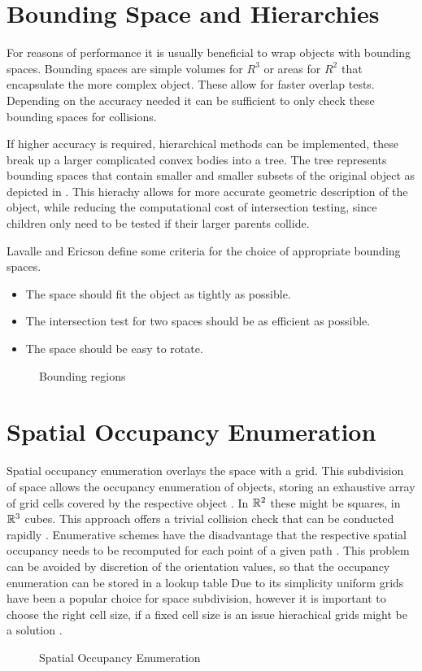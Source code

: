 \section{Bounding Space and Hierarchies}
For reasons of performance it is usually beneficial to wrap objects with bounding spaces. Bounding spaces are simple volumes for $R^3$ or areas for $R^2$ that encapsulate the more complex object. These allow for faster overlap tests. Depending on the accuracy needed it can be sufficient to only check these bounding spaces for collisions. \cite{LaValle.2006,Ericson.2005}

If higher accuracy is required, hierarchical methods can be implemented, these break up a larger complicated convex bodies into a tree. The tree represents bounding spaces that contain smaller and smaller subsets of the original object as depicted in . This hierachy allows for more accurate geometric description of the object, while reducing the computational cost of intersection testing, since children only need to be tested if their larger parents collide. \cite{LaValle.2006,Ericson.2005}

Lavalle and Ericson define some criteria for the choice of appropriate bounding spaces.

\begin{itemize}
	\item The space should fit the object as tightly as possible.
	\item The intersection test for two spaces should be as efficient as possible.
	\item The space should be easy to rotate.
\end{itemize}

\begin{figure}[h]
    \caption{Bounding regions}
    \label{fig:boundingRegions}
\end{figure}

\section{Spatial Occupancy Enumeration}
Spatial occupancy enumeration overlays the space with a grid. This subdivision of space allows the occupancy enumeration of objects, storing an exhaustive array of grid cells covered by the respective object \cite{Ericson.2005,Hayward.1986}. In $\mathbb{R}^2$ these might be squares, in $\mathbb{R}^3$ cubes. This approach offers a trivial collision check that can be conducted rapidly \cite{Ericson.2005,Hayward.1986}. Enumerative schemes have the disadvantage that the respective spatial occupancy needs to be recomputed for each point of a given path \cite{Hayward.1986}. This problem can be avoided by discretion of the orientation values, so that the occupancy enumeration can be stored in a lookup table \cite{Ziegler.2008} Due to its simplicity uniform grids have been a popular choice for space subdivision, however it is important to choose the right cell size, if a fixed cell size is an issue hierachical grids might be a solution \cite{Ericson.2005}.

\begin{figure}[h]
    \caption{Spatial Occupancy Enumeration}
    \label{fig:spatialOccupancyEnumeration}
\end{figure}